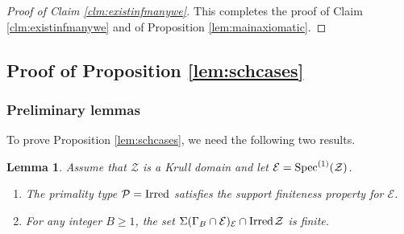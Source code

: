 \documentclass[11pt,a4paper,reqno]{amsart}
\def\s1{{\rm Spec}^{(1)}}
\newtheorem{lem}[thm]{Lemma}
\theoremstyle{definition}
\begin{document}
\begin{proof}[Proof of Claim \ref{clm:existinfmanywe}]
This completes the proof of Claim \ref{clm:existinfmanywe} and of Proposition \ref{lem:mainaxiomatic}.
\end{proof}

\subsection{Proof of Proposition \ref{lem:schcases}} \label{ssec:prop3.6}
\subsubsection{Preliminary lemmas} To prove Proposition \ref{lem:schcases}, we need the following two results.

\begin{lem}\label{lem:interrest}
Assume that $\mathcal{Z}$ is a Krull domain and let $\mathcal{E}=\s1(\mathcal{Z})$.
\begin{enumerate}
\item The primality type ${\mathcal P}={\rm Irred}$ satisfies the support finiteness property for $\mathcal{E}$. \label{lem:finirrproide}  
\item For any integer $B \geq 1$, the set $\Sigma(\Gamma_B \cap \mathcal{E})_{\mathcal{E}} \cap {\rm Irred}\hskip 1pt \mathcal{Z}$ is finite.
\label{cor:finSigmaM}
\end{enumerate}
\end{lem}
\end{document}
